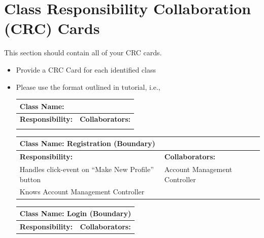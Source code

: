 \documentclass[]{article}
\begin{document}

	
\section{Class Responsibility Collaboration (CRC) Cards}
\label{sec:class_responsibility_collaboration_crc_cards}
This section should contain all of your CRC cards.

\begin{itemize}
	\item Provide a CRC Card for each identified class
	\item Please use the format outlined in tutorial, i.e., 
	\begin{table}[H]
		\centering
		\begin{tabular}{|p{6cm}|p{6cm}|}
		\hline 
		 \multicolumn{2}{|l|}{\textbf{Class Name:}} \\
		\hline
		\textbf{Responsibility:} & \textbf{Collaborators:} \\
		\hline
		\vspace{1in} & \\
		\hline
		\end{tabular}
	\end{table}
        \begin{table}[H]
            \centering
            \begin{tabular}{|p{6cm}|p{6cm}|}
            \hline 
          \multicolumn{2}{|l|}{\textbf{Class Name: Registration (Boundary)}} \\
            \hline
            \textbf{Responsibility:} & \textbf{Collaborators:} \\
            \hline
               Handles click-event on “Make New Profile” button & Account        Management Controller \\
                 Knows Account Management Controller &\\
            \hline
            \end{tabular}
        \end{table}
        \begin{table}[H]
            \centering
            \begin{tabular}{|p{6cm}|p{6cm}|}
            \hline 
             \multicolumn{2}{|l|}{\textbf{Class Name: Login (Boundary)}} \\
            \hline
            \textbf{Responsibility:} & \textbf{Collaborators:} \\
            \hline

\end{tabular}
\end{table}
\end{itemize}
\end{document}
